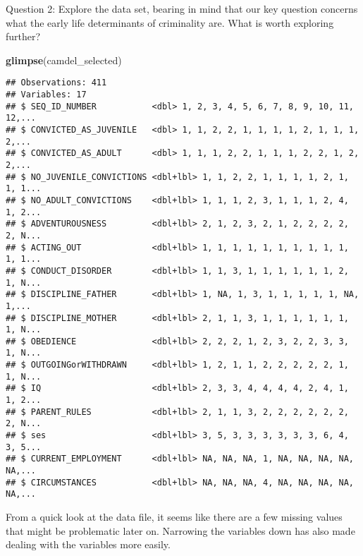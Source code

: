 \documentclass[]{article}
\newenvironment{Shaded}{\begin{snugshade}}{\end{snugshade}}
\newcommand{\KeywordTok}[1]{\textcolor[rgb]{0.13,0.29,0.53}{\textbf{#1}}}
\newcommand{\DecValTok}[1]{\textcolor[rgb]{0.00,0.00,0.81}{#1}}
\newcommand{\StringTok}[1]{\textcolor[rgb]{0.31,0.60,0.02}{#1}}
\newcommand{\CommentTok}[1]{\textcolor[rgb]{0.56,0.35,0.01}{\textit{#1}}}
\newcommand{\OperatorTok}[1]{\textcolor[rgb]{0.81,0.36,0.00}{\textbf{#1}}}
\newcommand{\NormalTok}[1]{#1}
\begin{document}
Question 2: Explore the data set, bearing in mind that our key question
concerns what the early life determinants of criminality are. What is
worth exploring further?

\begin{Shaded}
\begin{Highlighting}[]
\KeywordTok{glimpse}\NormalTok{(camdel_selected)}
\end{Highlighting}
\end{Shaded}

\begin{verbatim}
## Observations: 411
## Variables: 17
## $ SEQ_ID_NUMBER           <dbl> 1, 2, 3, 4, 5, 6, 7, 8, 9, 10, 11, 12,...
## $ CONVICTED_AS_JUVENILE   <dbl> 1, 1, 2, 2, 1, 1, 1, 1, 2, 1, 1, 1, 2,...
## $ CONVICTED_AS_ADULT      <dbl> 1, 1, 1, 2, 2, 1, 1, 1, 2, 2, 1, 2, 2,...
## $ NO_JUVENILE_CONVICTIONS <dbl+lbl> 1, 1, 2, 2, 1, 1, 1, 1, 2, 1, 1, 1...
## $ NO_ADULT_CONVICTIONS    <dbl+lbl> 1, 1, 1, 2, 3, 1, 1, 1, 2, 4, 1, 2...
## $ ADVENTUROUSNESS         <dbl+lbl> 2, 1, 2, 3, 2, 1, 2, 2, 2, 2, 2, N...
## $ ACTING_OUT              <dbl+lbl> 1, 1, 1, 1, 1, 1, 1, 1, 1, 1, 1, 1...
## $ CONDUCT_DISORDER        <dbl+lbl> 1, 1, 3, 1, 1, 1, 1, 1, 1, 2, 1, N...
## $ DISCIPLINE_FATHER       <dbl+lbl> 1, NA, 1, 3, 1, 1, 1, 1, 1, NA, 1,...
## $ DISCIPLINE_MOTHER       <dbl+lbl> 2, 1, 1, 3, 1, 1, 1, 1, 1, 1, 1, N...
## $ OBEDIENCE               <dbl+lbl> 2, 2, 2, 1, 2, 3, 2, 2, 3, 3, 1, N...
## $ OUTGOINGorWITHDRAWN     <dbl+lbl> 1, 2, 1, 1, 2, 2, 2, 2, 2, 1, 1, N...
## $ IQ                      <dbl+lbl> 2, 3, 3, 4, 4, 4, 4, 2, 4, 1, 1, 2...
## $ PARENT_RULES            <dbl+lbl> 2, 1, 1, 3, 2, 2, 2, 2, 2, 2, 2, N...
## $ ses                     <dbl+lbl> 3, 5, 3, 3, 3, 3, 3, 3, 6, 4, 3, 5...
## $ CURRENT_EMPLOYMENT      <dbl+lbl> NA, NA, NA, 1, NA, NA, NA, NA, NA,...
## $ CIRCUMSTANCES           <dbl+lbl> NA, NA, NA, 4, NA, NA, NA, NA, NA,...
\end{verbatim}

From a quick look at the data file, it seems like there are a few
missing values that might be problematic later on. Narrowing the
variables down has also made dealing with the variables more easily.

\begin{Shaded}
\end{Shaded}
\end{document}

